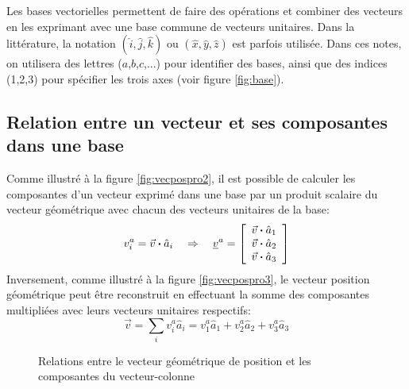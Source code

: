 Les bases vectorielles permettent de faire des opérations et combiner des vecteurs en les exprimant avec une base commune de vecteurs unitaires. Dans la littérature, la notation $(\hat{i},\hat{j},\hat{k})$ ou $(\hat{x},\hat{y},\hat{z})$ est parfois utilisée. Dans ces notes, on utilisera des lettres ($a$,$b$,$c$,...) pour identifier des bases, ainsi que des indices (1,2,3) pour spécifier les trois axes (voir figure \ref{fig:base}). 
 

\subsection{Relation entre un vecteur et ses composantes dans une base}

Comme illustré à la figure \ref{fig:vecpospro2}, il est possible de calculer les composantes d'un vecteur exprimé dans une base par un produit scalaire du vecteur géométrique avec chacun des vecteurs unitaires de la base:
\begin{equation}
v_i^a = \vec{v} \boldsymbol{\cdot} \hat{a}_i  \quad \Rightarrow \quad 
\underline{v}^{a} = \left[ \begin{array}{c} \vec{v} \boldsymbol{\cdot} \hat{a}_1 \\ \vec{v} \boldsymbol{\cdot} \hat{a}_2 \\ \vec{v} \boldsymbol{\cdot} \hat{a}_3  \end{array} \right] 
\end{equation} 
Inversement, comme illustré à la figure \ref{fig:vecpospro3}, le vecteur position géométrique peut être reconstruit en effectuant la somme des composantes multipliées avec leurs vecteurs unitaires respectifs:
\begin{equation}
\vec{v} = \sum_{i} v_i^a \hat{a}_i = v_1^a \hat{a}_1 + v_2^a \hat{a}_2 + v_3^a \hat{a}_3%
\end{equation} 
\begin{figure}[H]
        \centering
				\hspace{+20pt}
        \caption{Relations entre le vecteur géométrique de position et les composantes du vecteur-colonne}
				\label{fig:vecpospro23}
\end{figure}


